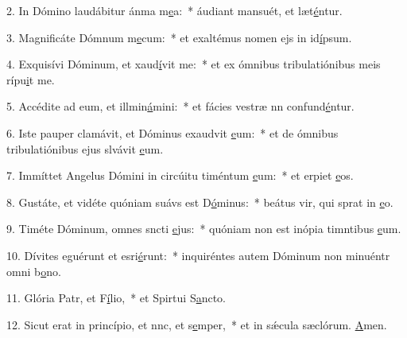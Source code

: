 2. In Dómino laudábitur ánma m\uline{e}a:~* áudiant mansuét, et læt\uline{é}ntur.\par 
3. Magnificáte Dómnum m\uline{e}cum:~* et exaltémus nomen ejs in id\uline{í}psum.\par 
4. Exquisívi Dóminum, et xaud\uline{í}vit me:~* et ex ómnibus tribulatiónibus meis rípu\uline{i}t me.\par 
5. Accédite ad eum, et illmin\uline{á}mini:~* et fácies vestræ nn confund\uline{é}ntur.\par 
6. Iste pauper clamávit, et Dóminus exaudvit \uline{e}um:~* et de ómnibus tribulatiónibus ejus slvávit \uline{e}um.\par 
7. Immíttet Angelus Dómini in circúitu timéntum \uline{e}um:~* et erpiet \uline{e}os.\par 
8. Gustáte, et vidéte quóniam suávs est D\uline{ó}minus:~* beátus vir, qui sprat in \uline{e}o.\par 
9. Timéte Dóminum, omnes sncti \uline{e}jus:~* quóniam non est inópia timntibus \uline{e}um.\par 
10. Dívites eguérunt et esri\uline{é}runt:~* inquiréntes autem Dóminum non minuéntr omni b\uline{o}no.\par 
11. Glória Patr, et F\uline{í}lio,~* et Spirtui S\uline{a}ncto.\par 
12. Sicut erat in princípio, et nnc, et s\uline{e}mper,~* et in sǽcula sæclórum. \uline{A}men.\par 
